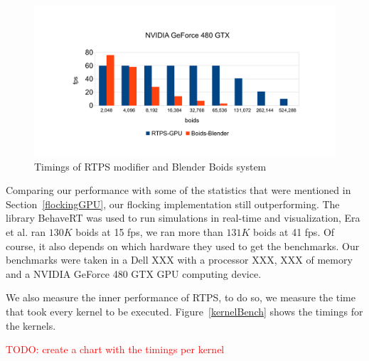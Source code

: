 \begin{figure}[htbp]
\begin{center}
\includegraphics[scale=0.45]{figures/benchmarks.pdf}
\caption{Timings of RTPS modifier and Blender Boids system}
\label{plot}
\end{center}
\end{figure}

Comparing our performance with some of the statistics that were mentioned in Section~\ref{flockingGPU}, our flocking implementation still outperforming. The library BehaveRT was used to run simulations in real-time and visualization, Era et al. ran $130K$ boids at 15 fps, we ran more than $131K$ boids at 41 fps. Of course, it also depends on which hardware they used to get the benchmarks. Our benchmarks were taken in a Dell XXX with a processor XXX, XXX of memory and a NVIDIA GeForce 480 GTX GPU computing device. 

We also measure the inner performance of RTPS, to do so, we measure the time that took every kernel to be executed. Figure~\ref{kernelBench} shows the timings for the kernels.

\textcolor{red}{TODO: create a chart with the timings per kernel}



